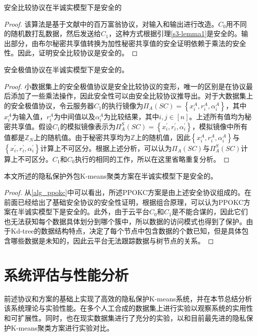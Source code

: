 \begin{theorem}
	安全比较协议在半诚实模型下是安全的
\end{theorem}
\begin{proof}
	该算法是基于文献\cite{rathee2020cryptflow2}中的百万富翁协议，对输入和输出进行改造。$ C_0 $用不同的随机数打乱数据，然后发送给$ C_1 $，这种方式根据引理\ref{s3-lemma1}是安全的。输出部分，由布尔秘密共享值转换为加性秘密共享值的安全证明依赖于乘法的安全性。因此，证明安全比较协议是安全的。
\end{proof}
\begin{theorem}
	安全极值协议在半诚实模型下是安全的。
\end{theorem}
\begin{proof}
	小数据集上的安全极值协议是安全比较协议的变形，唯一的区别是在协议最后添加了一些乘法操作，因此安全性可以由安全比较协议推导出。对于大数据集上的安全极值协议，令云服务器$ C_1 $的执行镜像为$\Pi_A(S C)=\left\{x_i^A, r_i^A, \alpha_i^A\right\}$，其中$ x_i^A $为输入值，$ r_i^A $为中间值以及$ \alpha_i^A $为比较结果，其中$ i,j\in[n] $。上述所有值均为秘密共享值。假设$ C_1 $的模拟镜像表示为$\Pi_A^S(S C)=\left\{x_i^{\prime}, r_i^{\prime}, \alpha_i^{\prime}\right\}$，模拟镜像中所有值都是$ \mathbb{Z}_N $上的随机值。由于秘密共享均为$ \mathbb{Z} $上的随机值，因此$ \left\{x_i^A, r_i^A, \alpha_i^A\right\} $与$ \left\{x_i^{\prime}, r_i^{\prime}, \alpha_i^{\prime}\right\} $计算上不可区分。根据上述分析，可以认为$ \Pi_A(SC) $与$ \Pi_A^S(SC) $计算上不可区分。$ C_1 $和$ C_0 $执行的相同的工作，所以在这里省略重复分析。
\end{proof}
\begin{theorem}
	本文所述的隐私保护外包K-means聚类方案在半诚实模型下是安全的。
\end{theorem}
\begin{proof}
	从\ref{alg_ppokc}中可以看出，所述PPOKC方案是由上述安全协议组成的。在前面已经给出了基础安全协议的安全性证明，根据组合原理\cite{goldreich2004encryption}，可以认为PPOKC方案在半诚实模型下是安全的。此外，由于云平台$ C_0 $和$ C_1 $是不能合谋的，因此它们也无法获知每个数据具体划分到哪个簇中，所以数据的访问模式也得到了保护。由于Kd-tree的数据结构特点，决定了每个节点中包含数据的个数已知，但是具体包含哪些数据是未知的，因此云平台无法跟踪数据与树节点的关系。
\end{proof}
\section{系统评估与性能分析}
\label{s3-shiyan}
前述协议和方案的基础上实现了高效的隐私保护K-means系统，并在本节总结分析该系统理论与实验性能。在多个人工合成的数据集上进行实验以观察系统的实用性和可扩展性。同时，也在现实数据集进行了充分的实验，以和目前最先进的隐私保护K-means聚类方案\cite{wu2020secure,mohassel2019practical}进行实验对比。
